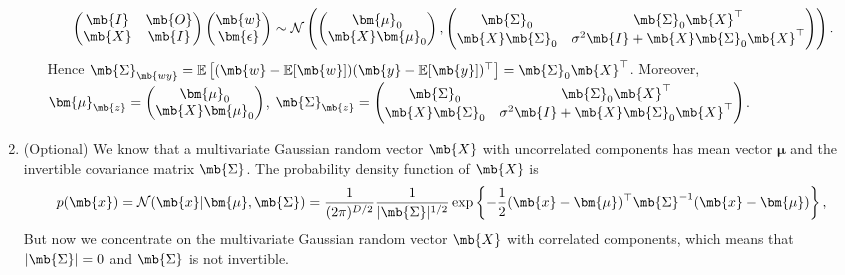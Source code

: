 \begin{exercise}
\begin{enumerate}
\begin{solution}
\begin{enumerate}
\begin{gather*}
\begin{pmatrix}
                                \mb{I} & \mb{O} \\
                                \mb{X} & \mb{I}
                            \end{pmatrix}
                            \begin{pmatrix}
                                \mb{w} \\
                                \bm{\epsilon}
                            \end{pmatrix}
                            \sim \mathcal{N}\left(
                            \begin{pmatrix}
                                    \bm{\mu}_0 \\
                                    \mb{X}\bm{\mu}_0
                                \end{pmatrix},
                            \begin{pmatrix}
                                    \mb{\Sigma}_0       & \mb{\Sigma}_0\mb{X}^\top                       \\    
                                    \mb{X}\mb{\Sigma}_0 & \sigma^2\mb{I}+\mb{X}\mb{\Sigma}_0\mb{X}^\top
                                \end{pmatrix}
                            \right).
                        \end{gather*}
                        Hence $\mb{\Sigma}_\mb{wy}=\mathbb{E}\left[(\mb{w}-\mathbb{E}[\mb{w}])(\mb{y}-\mathbb{E}[\mb{y}])^\top\right]=\mb{\Sigma}_0\mb{X}^\top$. Moreover, $\bm{\mu}_\mb{z}=\begin{pmatrix}\bm{\mu}_0\\\mb{X}\bm{\mu}_0\end{pmatrix}$, $\mb{\Sigma}_\mb{z}=\begin{pmatrix}\mb{\Sigma}_0 & \mb{\Sigma}_0\mb{X}^\top\\\mb{X}\mb{\Sigma}_0 & \sigma^2\mb{I}+\mb{X}\mb{\Sigma}_0\mb{X}^\top\end{pmatrix}$.
                        \qedhere
                \end{enumerate}
                \qedhere
            \end{solution}
            
        \item (Optional) We know that a multivariate Gaussian random vector $\mb{X}$ with uncorrelated components has mean vector $\bm{\mu}$ and the invertible covariance matrix  $\mb{\Sigma}$. The probability density function of $\mb{X}$ is
            \begin{align*}
                p(\mb{x})=\mathcal{N}(\mb{x}|\bm{\mu},\mb{\Sigma})=\frac{1}{(2\pi)^{D/2}}\frac{1}{|\mb{\Sigma}|^{1/2}}\exp\left\{-\frac{1}{2}(\mb{x}-\bm{\mu})^{\top}\mb{\Sigma}^{-1}(\mb{x}-\bm{\mu})\right\},
            \end{align*}
            But now we concentrate on the multivariate Gaussian random vector $\mb{X}$ with correlated components, which means that $|\mb{\Sigma}|=0$ and $\mb{\Sigma}$ is not invertible.
            

\end{enumerate}
\end{exercise}
